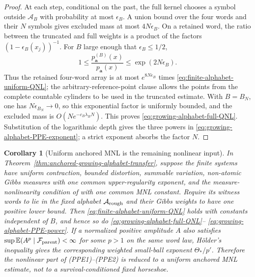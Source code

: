 \documentclass[11pt]{article}
\newtheorem{corollary}[theorem]{Corollary}
\begin{document}
\begin{proof}
At each step, conditional on the past, the full kernel chooses a symbol
outside $\mathcal A_B$ with probability at most $\epsilon_B$.  A union bound
over the four words and their $N$ symbols gives excluded mass at most
$4N\epsilon_B$.  On a retained word, the ratio between the truncated and
full weights is a product of the factors
$(1-\epsilon_B(x_j))^{-1}$.  For $B$ large enough that
$\epsilon_B\le1/2$,
\begin{equation}
\label{eq:finite-full-word-weight-comparison}
 1\le\frac{p_{\mathbf a}^{(B)}(x)}{p_{\mathbf a}(x)}
 \le \exp(2N\epsilon_B).
\end{equation}
Thus the retained four-word array is at most
$e^{8N\epsilon_B}$ times
\eqref{eq:finite-alphabet-uniform-QNL}; the arbitrary-reference-point clause
allows the points from the complete countable cylinders to be used in the
truncated estimate.  With
$B=B_N$, one has $N\epsilon_{B_N}\to0$, so this exponential factor is
uniformly bounded, and the excluded mass is
$O(Ne^{-c_B\lambda_BN})$.  This proves
\eqref{eq:growing-alphabet-full-QNL}.  Substitution of the logarithmic depth
gives the three powers in
\eqref{eq:growing-alphabet-PPE-exponent}; a strict exponent absorbs the
factor $N$.
\end{proof}

\begin{corollary}[Uniform anchored MNL is the remaining nonlinear input]
\label{cor:uniform-anchored-MNL-transfer}
In Theorem~\ref{thm:anchored-growing-alphabet-transfer}, suppose the
finite systems have uniform contraction, bounded distortion, summable
variation, non-atomic Gibbs measures with one common upper-regularity
exponent, and the measure-nonlinearity condition of
\cite[Theorem~1.2]{LPS} with one common MNL constant.  Require its witness
words to lie in the fixed alphabet $\mathcal A_{\rm rough}$ and their Gibbs
weights to have one positive lower bound.  Then
\eqref{eq:finite-alphabet-uniform-QNL} holds with constants independent of
$B$, and hence so do
\eqref{eq:growing-alphabet-full-QNL}--
\eqref{eq:growing-alphabet-PPE-power}.  If a normalized positive amplitude
$A$ also satisfies
$\sup\mathbb E(A^p\mid\mathcal F_{\rm parent})<\infty$ for some $p>1$ on
the same word law, H\"older's inequality gives the corresponding weighted
small-ball exponent $\Theta_*/p'$.  Therefore the nonlinear part of
\textup{(PPE1)--(PPE2)} is reduced to a uniform anchored MNL estimate, not
to a survival-conditioned fixed horseshoe.
\end{corollary}
\end{document}
